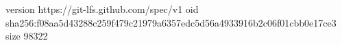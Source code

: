 version https://git-lfs.github.com/spec/v1
oid sha256:f08aa5d43288c259f479c21979a6357edc5d56a4933916b2c06f01cbb0e17ce3
size 98322
